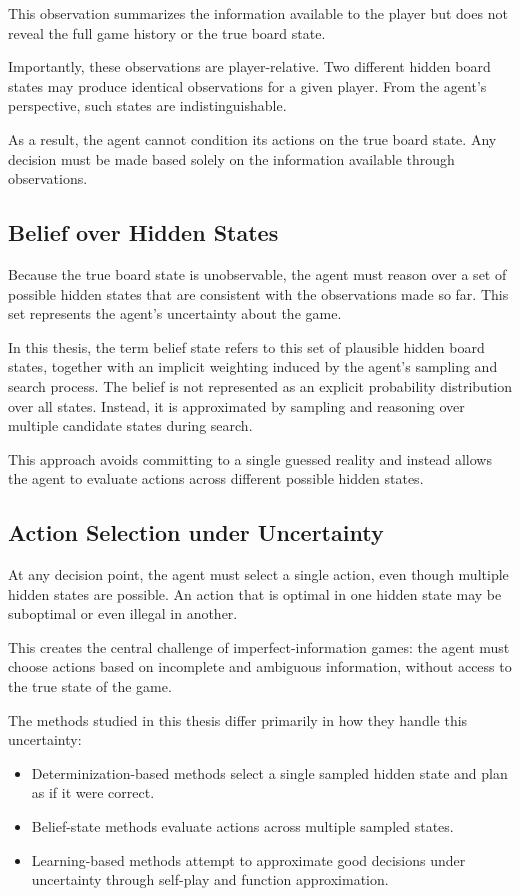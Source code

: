 \documentclass[12pt,oneside,openright]{article}
\begin{document}
This observation summarizes the information available to the player but does not reveal the full game history or the true board state.

Importantly, these observations are player-relative. Two different hidden board states may produce identical observations for a given player. From the agent's perspective, such states are indistinguishable.

As a result, the agent cannot condition its actions on the true board state. Any decision must be made based solely on the information available through observations.

\subsection{Belief over Hidden States}

Because the true board state is unobservable, the agent must reason over a set of possible hidden states that are consistent with the observations made so far. This set represents the agent's uncertainty about the game.

In this thesis, the term belief state refers to this set of plausible hidden board states, together with an implicit weighting induced by the agent's sampling and search process. The belief is not represented as an explicit probability distribution over all states. Instead, it is approximated by sampling and reasoning over multiple candidate states during search.

This approach avoids committing to a single guessed reality and instead allows the agent to evaluate actions across different possible hidden states.


\subsection{Action Selection under Uncertainty}

At any decision point, the agent must select a single action, even though multiple hidden states are possible. An action that is optimal in one hidden state may be suboptimal or even illegal in another.

This creates the central challenge of imperfect-information games: the agent must choose actions based on incomplete and ambiguous information, without access to the true state of the game.

The methods studied in this thesis differ primarily in how they handle this uncertainty:

\begin{itemize}
  \item Determinization-based methods select a single sampled hidden state and plan as if it were correct.
  \item Belief-state methods evaluate actions across multiple sampled states.
  \item Learning-based methods attempt to approximate good decisions under uncertainty through self-play and function approximation.
\end{itemize}
\end{document}
